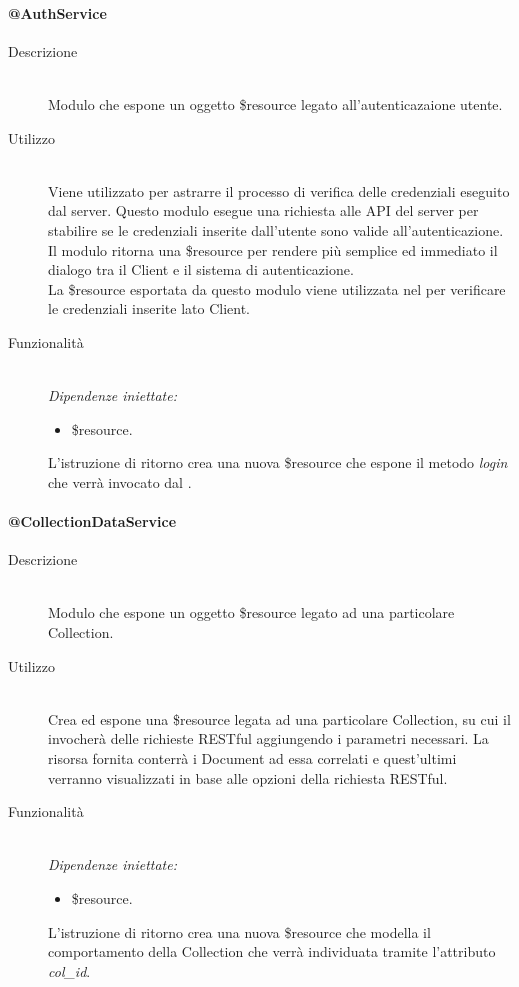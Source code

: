 \paragraph{@AuthService}
\begin{description}
 \item[Descrizione] \hfill \\
 Modulo che espone un oggetto \$resource legato all'autenticazaione utente.
 \item[Utilizzo] \hfill \\
 Viene utilizzato per astrarre il processo di verifica delle credenziali eseguito dal server. Questo modulo esegue una richiesta alle API del server per stabilire se le credenziali inserite dall'utente sono valide all'autenticazione. Il modulo ritorna una \$resource per rendere più semplice ed immediato il dialogo tra il Client e il sistema di autenticazione. \\
 La \$resource esportata da questo modulo viene utilizzata nel  per verificare le credenziali inserite lato Client.
 \item[Funzionalità] \hfill \\
 \emph{Dipendenze iniettate:}
 \begin{itemize}
  \item \$resource.
 \end{itemize}
 L'istruzione di ritorno crea una nuova \$resource che espone il metodo \textit{login} che verrà invocato dal .
\end{description}

\paragraph{@CollectionDataService}
\begin{description}
 \item[Descrizione] \hfill \\
 Modulo che espone un oggetto \$resource legato ad una particolare Collection. 
 
 \item[Utilizzo] \hfill \\
 Crea ed espone una \$resource legata ad una particolare Collection, su cui il  invocherà delle richieste RESTful aggiungendo i parametri necessari. La risorsa fornita conterrà i Document ad essa correlati e quest'ultimi verranno visualizzati in base alle opzioni della richiesta RESTful.
 
 \item[Funzionalità] \hfill \\
 \emph{Dipendenze iniettate:}
 \begin{itemize}
  \item \$resource.
 \end{itemize}
 L'istruzione di ritorno crea una nuova \$resource che modella il comportamento della Collection che verrà individuata tramite l'attributo \textit{col\_id}.
\end{description}

